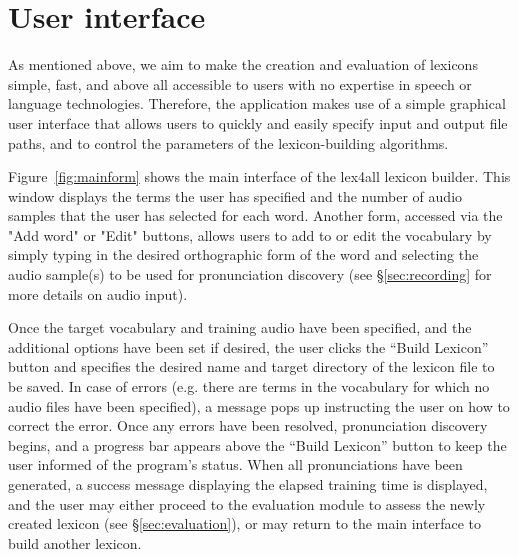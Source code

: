 \documentclass[11pt]{article}
\begin{document}
\section{User interface}
\label{sec:frontend}

As mentioned above, we aim to make the creation and evaluation of lexicons simple, fast, and above all accessible to users with no expertise in speech or language technologies. Therefore, the application makes use of a simple graphical user interface that allows users to quickly and easily specify input and output file paths, and to control the parameters of the lexicon-building algorithms. 

Figure~\ref{fig:mainform} shows the main interface of the lex4all lexicon builder. This window displays the terms the user has specified and the number of audio samples that the user has selected for each word. Another form, accessed via the "Add word" or "Edit" buttons, allows users to add to or edit the vocabulary by simply typing in the desired orthographic form of the word and selecting the audio sample(s) to be used for pronunciation discovery (see \S\ref{sec:recording} for more details on audio input).


Once the target vocabulary and training audio have been specified, and the additional options have been set if desired, the user clicks the ``Build Lexicon'' button and specifies the desired name and target directory of the lexicon file to be saved. In case of errors (e.g. there are terms in the vocabulary for which no audio files have been specified), a message pops up instructing the user on how to correct the error. Once any errors have been resolved, pronunciation discovery begins, and a progress bar appears above the ``Build Lexicon'' button to keep the user informed of the program's status. When all pronunciations have been generated, a success message displaying the elapsed training time is displayed, and the user may either proceed to the evaluation module to assess the newly created lexicon (see \S\ref{sec:evaluation}), or may return to the main interface to build another lexicon. 
\end{document}

